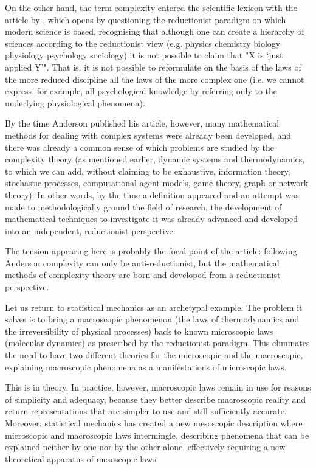 \documentclass[a4paper, headings=standardclasses]{scrartcl}
\begin{document}
On the other hand, the term complexity entered the scientific lexicon with the \citeyear{anderson1972} article by \citeauthor{anderson1972}, which opens by questioning the reductionist paradigm on which modern science is based, recognising that although one can create a hierarchy of sciences according to the reductionist view (e.g. physics \textrightarrow{} chemistry \textrightarrow{} biology \textrightarrow{} physiology \textrightarrow{} psychology \textrightarrow{} sociology) it is not possible to claim that "X is `just applied Y'".
That is, it is not possible to reformulate on the basis of the laws of the more reduced discipline all the laws of the more complex one (i.e. we cannot express, for example, all psychological knowledge by referring only to the underlying physiological phenomena).

By the time Anderson published his article, however, many mathematical methods for dealing with complex systems were already been developed, and there was already a common sense of which problems are studied by the complexity theory (as mentioned earlier, dynamic systems and thermodynamics, to which we can add, without claiming to be exhaustive, information theory, stochastic processes, computational agent models, game theory, graph or network theory).
In other words, by the time a definition appeared and an attempt was made to methodologically ground the field of research, the development of mathematical techniques to investigate it was already advanced and developed into an independent, reductionist perspective.

The tension appearing here is probably the focal point of the article: following Anderson complexity can only be anti-reductionist, but the mathematical methods of complexity theory are born and developed from a reductionist perspective.

Let us return to statistical mechanics as an archetypal example. The problem it solves is to bring a macroscopic phenomenon (the laws of thermodynamics and the irreversibility of physical processes) back to known microscopic laws (molecular dynamics) as prescribed by the reductionist paradigm.  This eliminates the need to have two different theories for the microscopic and the macroscopic, explaining macroscopic phenomena as a manifestations of microscopic laws.

This is in theory. In practice, however, macroscopic laws remain in use for reasons of simplicity and adequacy, because they better describe macroscopic reality and return representations that are simpler to use and still sufficiently accurate.
Moreover, statistical mechanics has created a new mesoscopic description where microscopic and macroscopic laws intermingle, describing phenomena that can be explained neither by one nor by the other alone, effectively requiring a new theoretical apparatus of mesoscopic laws.
\end{document}
